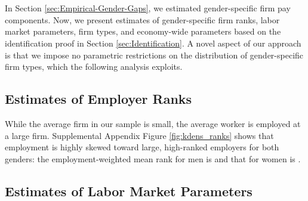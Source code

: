 

\section{{\sectionsix}\label{sec:Results}}

In Section \ref{sec:Empirical-Gender-Gaps}, we estimated gender-specific firm pay components. Now, we present estimates of gender-specific %
firm ranks, %
labor market parameters, %
firm types, and %
economy-wide parameters %
based on the identification proof in Section \ref{sec:Identification}. %
%
A novel aspect of our approach is that we impose no parametric restrictions on the distribution of gender-specific firm types, which the following analysis exploits.


\subsection{Estimates of Employer Ranks\label{subsec:estimated_ranks}}

While the average firm in our sample is small, the average worker is employed at a large firm. Supplemental Appendix Figure \ref{fig:kdens_ranks} shows that employment is highly skewed toward large, high-ranked employers for both genders: the employment-weighted mean rank for men is  and that for women is  .


\subsection{Estimates of Labor Market Parameters\label{subsec:labparams_b}}

